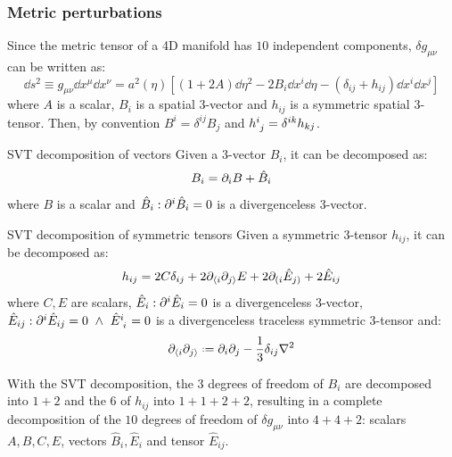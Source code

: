 \subsubsection{Metric perturbations}

Since the metric tensor of a 4D manifold has $ 10 $ independent components, $ \delta g_{\mu \nu} $ can be written as:
\begin{equation}
  \dd s^2 \equiv g_{\mu \nu} \dd x^\mu \dd x^\nu = a^2(\eta) \left[ \left( 1 + 2A \right) \dd \eta^2 - 2 B_i \dd x^i \dd \eta - \left( \delta_{ij} + h_{ij} \right) \dd x^i \dd x^j \right]
  \label{eq:metric-pert}
\end{equation}
where $ A $ is a scalar, $ B_i $ is a spatial 3-vector and $ h_{ij} $ is a symmetric spatial 3-tensor. Then, by convention $ B^i = \delta^{ij} B_j $ and $ \tensor{h}{^i_j} = \delta^{ik} h_{kj} $.

\begin{lemma}{SVT decomposition of vectors}{}
  Given a 3-vector $ B_i $, it can be decomposed as:
  \begin{equation}
    B_i = \partial_i B + \hat B_i
  \end{equation}
  where $ B $ is a scalar and $ \hat B_i : \partial^i \hat B_i = 0 $ is a divergenceless 3-vector.
\end{lemma}

\begin{lemma}{SVT decomposition of symmetric tensors}{}
  Given a symmetric 3-tensor $ h_{ij} $, it can be decomposed as:
  \begin{equation}
    h_{ij} = 2C \delta_{ij} + 2 \partial_{\langle i} \partial_{j \rangle} E + 2 \partial_{(i} \hat E_{j)} + 2 \hat E_{ij}
  \end{equation}
  where $ C , E $ are scalars, $ \hat E_i : \partial^i \hat E_i = 0 $ is a divergenceless 3-vector, $ \hat E_{ij} : \pa^i \hat E_{ij} = 0 \,\,\land\,\, \tensor{\hat E}{^i_i} = 0 $ is a divergenceless traceless symmetric 3-tensor and:
  \begin{equation}
    \pa_{\langle i} \pa_{j \rangle} \defeq \pa_i \pa_j - \frac{1}{3} \delta_{ij} \lap
  \end{equation}
\end{lemma}

With the SVT decomposition, the $ 3 $ degrees of freedom of $ B_i $ are decomposed into $ 1 + 2 $ and the $ 6 $ of $ h_{ij} $ into $ 1 + 1 + 2 + 2 $, resulting in a complete decomposition of the $ 10 $ degrees of freedom of $ \delta g_{\mu \nu} $ into $ 4 + 4 + 2 $: scalars $ A,B,C,E $, vectors $ \hat B_i , \hat E_i $ and tensor $ \hat E_{ij} $.

